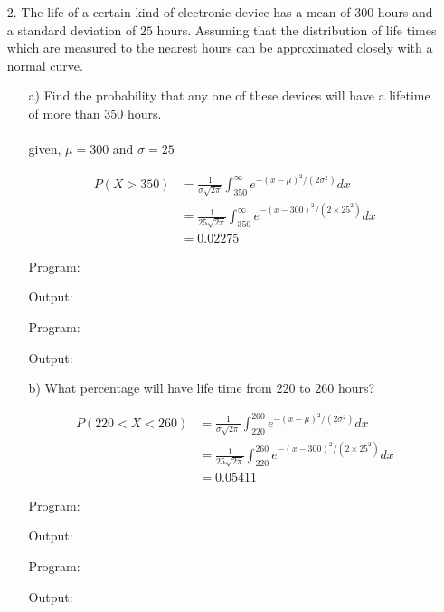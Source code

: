 \documentclass[a4paper,10pt,openright]{report}
\begin{document}
\begin{enumerate}
\item[2.] The life of a certain kind of electronic device has a mean of $300$ hours and a
standard deviation of $25$ hours. Assuming that the distribution of life times which are
measured to the nearest hours can be approximated closely with a normal curve.

\begin{enumerate}

\item[a)] Find the probability that any one of these devices will have a lifetime of more
than $350$ hours. \\ \\
given, $\mu = 300$ and $\sigma = 25$

\begin{equation*}
\begin{split}
P(X > 350) &= \frac{1}{\sigma\sqrt{2\pi}} \int_{350}^{\infty} e^{-(x-\mu)^2/(2\sigma^{2})} dx \\
		   &= \frac{1}{25\sqrt{2\pi}} \int_{350}^{\infty} e^{-(x-300)^2/(2 \times 25^{2})} dx \\
		   &= 0.02275
\end{split}
\end{equation*}

Program:

Output:


Program:

Output:


\item[b)] What percentage will have life time from $220$ to $260$ hours?

\begin{equation*}
\begin{split}
P(220 < X < 260) &= \frac{1}{\sigma\sqrt{2\pi}} \int_{220}^{260} e^{-(x-\mu)^2/(2\sigma^{2})} dx \\
		&= \frac{1}{25\sqrt{2\pi}} \int_{220}^{260} e^{-(x-300)^2/(2 \times 25^{2})} dx \\
		&= 0.05411
\end{split}
\end{equation*}

Program:

Output:


Program:

Output:


\end{enumerate}


\end{enumerate}
\end{document}
